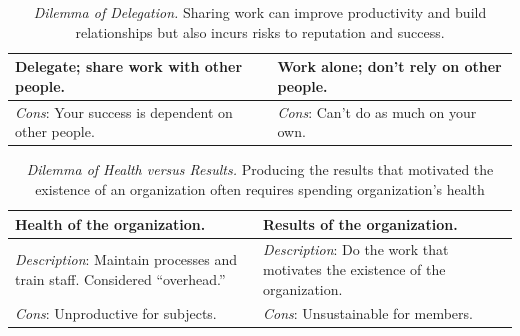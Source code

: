 \begin{center}
\begin{table}[H] %
\begin{tabular}{ | m{\dilemmatablewidth}| m{\dilemmatablewidth} | } 
  \hline
  \textbf{Delegate; share work with other people.} & 
  \textbf{Work alone; don't rely on other people.} \\ 
  \hline
  \textit{Cons}: Your success is dependent on other people. & 
  \textit{Cons}: Can't do as much on your own. \\  
  \hline
\end{tabular}
\caption{
\textit{Dilemma of Delegation.}
Sharing work can improve productivity and build relationships but also incurs risks to reputation and success.
}
\label{table:dilemma-personal-delegate-or-not}
\end{table}
\end{center}



\begin{center}
\begin{table}[H] %
\begin{tabular}{ | m{\dilemmatablewidth}| m{\dilemmatablewidth} | } 
  \hline
  \textbf{Health of the organization.} & 
  \textbf{Results of the organization.} \\ 
  \hline
  \textit{Description}: Maintain processes and train staff. Considered ``overhead.'' & 
  \textit{Description}: Do the work that motivates the existence of the organization. \\  
    \hline
  \textit{Cons}: Unproductive for subjects. & 
  \textit{Cons}: Unsustainable for members. \\
  \hline
\end{tabular}
\caption{
\textit{Dilemma of Health versus Results.}
 Producing the results that motivated the existence of an organization often requires spending organization's health
}
\label{table:dilemma-personal-health-vs-results}
\end{table}
\end{center}


